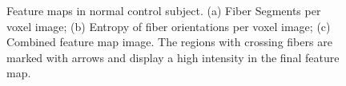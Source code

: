 \documentclass{llncs}
\begin{document}
\begin{figure}
    \centering
    \caption{Feature maps in normal control subject. (a) Fiber Segments per voxel image; (b) Entropy of fiber orientations per voxel image; (c) Combined feature map image. The regions with crossing fibers are marked with arrows and display a high intensity in the final feature map.}
    \label{fig:featureMap}
\end{figure}

%
%
\end{document}
